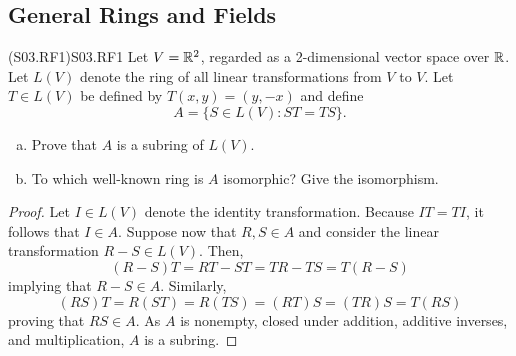 \documentclass[../AlgebraQualSolutions.tex]{subfiles}
\begin{document}
\subsection{General Rings and Fields}

\begin{prob}{(S03.RF1)}{S03.RF1}
    Let $V = \mathbb{R}^2$, regarded as a 2-dimensional vector space over $\mathbb{R}$. Let $L(V)$ denote the ring of all linear transformations from $V$ to $V$. Let $T \in L(V)$ be defined by $T(x,y) = (y,-x)$ and define
        \[A = \{S \in L(V): ST = TS\}.\]
    \begin{enumerate}[(a)]
        \item Prove that $A$ is a subring of $L(V)$.
        \item To which well-known ring is $A$ isomorphic? Give the isomorphism.
    \end{enumerate}
\end{prob}

\begin{proof}
    Let $I \in L(V)$ denote the identity transformation. Because $IT = TI$, it follows that $I \in A$. Suppose now that $R,S \in A$ and consider the linear transformation $R - S \in L(V)$. Then,
        \[(R-S)T = RT -ST = TR - TS = T(R - S)\]
    implying that $R - S \in A$. Similarly,
        \[(RS)T = R(ST) = R(TS) = (RT)S = (TR)S = T(RS)\]
    proving that $RS \in A$. As $A$ is nonempty, closed under addition, additive inverses, and multiplication, $A$ is a subring.
\end{proof}
\end{document}
